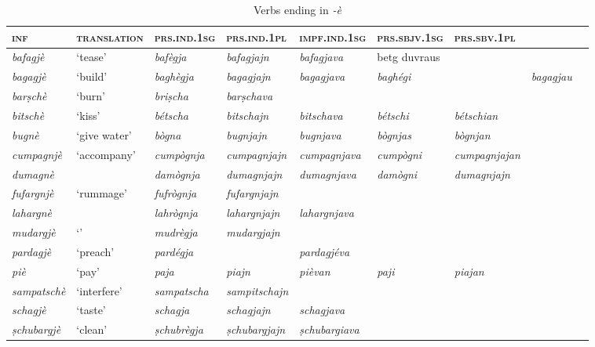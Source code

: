 \begin{sidewaystable} 
	\caption{Verbs ending in \textit{-è}}

	\begin{tabularx}{\textwidth}{lllllllll} 
		\lsptoprule
		 \textsc{\textbf{inf}} & \textsc{\textbf{translation}} & \textsc{\textbf{prs.ind.1sg}} & \textsc{\textbf{prs.ind.1pl}} & \textsc{\textbf{impf.ind.1sg}} & \textsc{\textbf{prs.sbjv.1sg}} & \textsc{\textbf{prs.sbv.1pl}} \\
		\midrule
		\textit{bafagjè} & ‘tease’ & \textit{bafègja} & \textit{bafagjajn} & \textit{bafagjava} &betg duvraus & \\
	\textit{bagagjè} & ‘build’ & \textit{baghègja} & \textit{bagagjajn} & \textit{bagagjava} & \textit{baghégi} & & \textit{bagagjau} \\
	\textit{barṣchè} & ‘burn’ & \textit{briṣcha} & \textit{barṣchava} \\
	\textit{bitschè} & ‘kiss’ & \textit{bétscha} & \textit{bitschajn} & \textit{bitschava} & \textit{bétschi} & \textit{bétschian}\\ 
	\textit{bugnè} & ‘give water’ & \textit{bògna} & \textit{bugnjajn} & \textit{bugnjava} & \textit{bògnjas} & \textit{bògnjan}\\
	\textit{cumpagnjè} & ‘accompany’ & \textit{cumpògnja} & \textit{cumpagnjajn} & \textit{cumpagnjava} & \textit{cumpògni} & \textit{cumpagnjajan}\\
	\textit{dumagnè} & & \textit{damògnja} & \textit{dumagnjajn} & \textit{dumagnjava} & \textit{damògni} & \textit{dumagnjajn}\\
	\textit{fufargnjè} & ‘rummage’ & \textit{fufrògnja} & \textit{fufargnjajn}\\
	\textit{lahargnè} & & \textit{lahrògnja} & \textit{lahargnjajn}& \textit{lahargnjava}\\
	\textit{mudargjè} & `' & \textit{mudrègja} & \textit{mudargjajn} & & \\
	\textit{pardagjè} & ‘preach’ & \textit{pardégja} & & \textit{pardagjéva} \\
	\textit{piè} & ‘pay’ & \textit{paja} & \textit{piajn} & \textit{pièvan} & \textit{paji} & \textit{piajan}\\
	\textit{sampatschè} & ‘interfere’ & \textit{sampatscha} & \textit{sampitschajn} & \\ 
	\textit{schagjè} & `taste' & \textit{schagja} & \textit{schagjajn} & \textit{schagjava} & \\
	\textit{ṣchubargjè} & `clean' & \textit{ṣchubrègja} & \textit{ṣchubargjajn} & \textit{ṣchubargiava}\\

\end{tabularx}
\end{sidewaystable}
